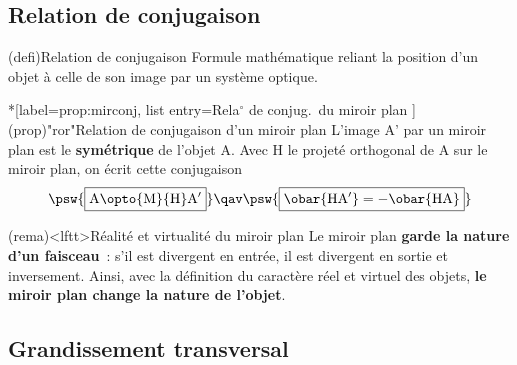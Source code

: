 \documentclass[../../main/main.tex]{subfiles}
\begin{document}
\subsection{Relation de conjugaison}


\begin{tcb*}[label=def:relconj](defi){Relation de conjugaison}
	Formule mathématique reliant la position d'un objet à celle de son image
	par un système optique.
\end{tcb*}
\begin{tcb*}*[label=prop:mirconj,
		list entry={\lte Rela$^\circ$ de conjug.\ du miroir plan}%
	](prop)"ror"{Relation de conjugaison d'un miroir plan}
	L'image A' par un miroir plan est le \textbf{symétrique} de l'objet
	A. Avec H le projeté orthogonal de A sur le miroir plan, on écrit
	cette conjugaison
	\[
		\psw{%
			\boxed{\rm A \opto{\rm M}{\rm H} A'}
		}%
		\qav
		\psw{%
			\boxed{\obar{\rm HA'} = -\obar{\rm HA}}
		}%
	\]
\end{tcb*}
\begin{tcb}[label=rema:mirrv](rema)<lftt>{Réalité et virtualité du miroir plan}
	Le miroir plan \textbf{garde la nature d'un faisceau}~: s'il est divergent en
	entrée, il est divergent en sortie et inversement. Ainsi, avec la définition
	du caractère réel et virtuel des objets, \textbf{le miroir plan change la
		nature de l'objet}.
\end{tcb}

\subsection{Grandissement transversal}
\end{document}
